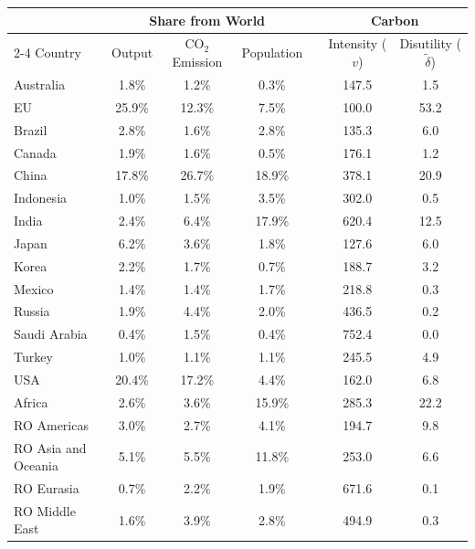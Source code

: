 \begin{tabular}{l ccc c cc}
\toprule
 & \multicolumn{3}{c}{Share from World} & & \multicolumn{2}{c}{Carbon}  \\
\cline{2-4}
\cline{6-7}
\addlinespace[3pt]
Country & Output & $\text{CO}_2$ Emission & Population & & Intensity ($v$) & Disutility ($\tilde{\delta}$) \\
\midrule
Australia & 1.8\% & 1.2\% & 0.3\% &&147.5 & 1.5 \\EU & 25.9\% & 12.3\% & 7.5\% &&100.0 & 53.2 \\Brazil & 2.8\% & 1.6\% & 2.8\% &&135.3 & 6.0 \\Canada & 1.9\% & 1.6\% & 0.5\% &&176.1 & 1.2 \\China & 17.8\% & 26.7\% & 18.9\% &&378.1 & 20.9 \\Indonesia & 1.0\% & 1.5\% & 3.5\% &&302.0 & 0.5 \\India & 2.4\% & 6.4\% & 17.9\% &&620.4 & 12.5 \\Japan & 6.2\% & 3.6\% & 1.8\% &&127.6 & 6.0 \\Korea & 2.2\% & 1.7\% & 0.7\% &&188.7 & 3.2 \\Mexico & 1.4\% & 1.4\% & 1.7\% &&218.8 & 0.3 \\Russia & 1.9\% & 4.4\% & 2.0\% &&436.5 & 0.2 \\Saudi Arabia & 0.4\% & 1.5\% & 0.4\% &&752.4 & 0.0 \\Turkey & 1.0\% & 1.1\% & 1.1\% &&245.5 & 4.9 \\USA & 20.4\% & 17.2\% & 4.4\% &&162.0 & 6.8 \\Africa & 2.6\% & 3.6\% & 15.9\% &&285.3 & 22.2 \\RO Americas & 3.0\% & 2.7\% & 4.1\% &&194.7 & 9.8 \\RO Asia and Oceania & 5.1\% & 5.5\% & 11.8\% &&253.0 & 6.6 \\RO Eurasia & 0.7\% & 2.2\% & 1.9\% &&671.6 & 0.1 \\RO Middle East & 1.6\% & 3.9\% & 2.8\% &&494.9 & 0.3 \\ \bottomrule
\end{tabular}
